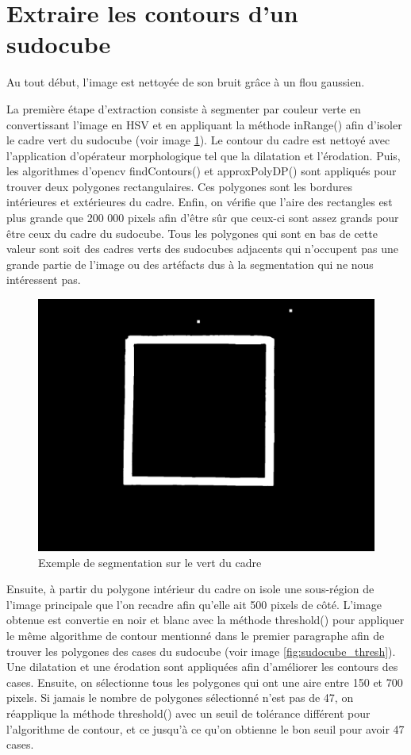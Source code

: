 \section{Extraire les contours d'un sudocube}

Au tout début, l'image est nettoyée de son bruit grâce à un flou gaussien.

La première étape d'extraction consiste à segmenter par couleur verte en convertissant l'image en HSV et en appliquant la méthode inRange() afin d'isoler le cadre vert du sudocube (voir image \ref{fig:segmentation_vert}). Le contour du cadre est nettoyé avec l'application d'opérateur morphologique tel que la dilatation et l'érodation. Puis, les algorithmes d'opencv findContours() et approxPolyDP() sont appliqués pour trouver deux polygones rectangulaires. Ces polygones sont les bordures intérieures et extérieures du cadre. Enfin, on vérifie que l'aire des rectangles est plus grande que 200 000 pixels afin d'être sûr que ceux-ci sont assez grands pour être ceux du cadre du sudocube. Tous les polygones qui sont en bas de cette valeur sont soit des cadres verts des sudocubes adjacents qui n'occupent pas une grande partie de l'image ou des artéfacts dus à la segmentation qui ne nous intéressent pas.

\begin{figure}[h!]
\centering
\includegraphics[scale=0.20]{fig/cadreVertSegmente.jpeg}
\caption{Exemple de segmentation sur le vert du cadre}
\label{fig:segmentation_vert}
\end{figure}

Ensuite, à partir du polygone intérieur du cadre on isole une sous-région de l'image principale que l'on recadre afin qu'elle ait 500 pixels de côté. L'image obtenue est convertie en noir et blanc avec la méthode threshold() pour appliquer le même algorithme de contour mentionné dans le premier paragraphe afin de trouver les polygones des cases du sudocube (voir image \ref{fig:sudocube_thresh}). Une dilatation et une érodation sont appliquées afin d'améliorer les contours des cases. Ensuite, on sélectionne tous les polygones qui ont une aire entre 150 et 700 pixels. Si jamais le nombre de polygones sélectionné n'est pas de 47, on réapplique la méthode threshold() avec un seuil de tolérance différent pour l'algorithme de contour, et ce jusqu'à ce qu'on obtienne le bon seuil pour avoir 47 cases. 

